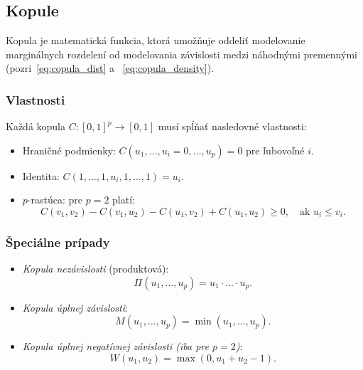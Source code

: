 \subsection{Kopule}
\label{subsec:copulas}

Kopula je matematická funkcia, ktorá umožňuje oddeliť modelovanie marginálnych rozdelení od modelovania závislosti medzi náhodnými premennými (pozri~\ref{eq:copula_dist} a ~\ref{eq:copula_density}).

\subsubsection{Vlastnosti}

Každá kopula $C: [0,1]^p \to [0,1]$ musí spĺňať nasledovné vlastnosti:

\begin{itemize}
  \item Hraničné podmienky: $C(u_1, \dots, u_i = 0, \dots, u_p) = 0$ pre ľubovoľné $i$.
  \item Identita: $C(1, \dots, 1, u_i, 1, \dots, 1) = u_i$.
  \item $p$-rastúca: pre $p=2$ platí:
  \begin{equation}
    C(v_1, v_2) - C(v_1, u_2) - C(u_1, v_2) + C(u_1, u_2) \geq 0, \quad \text{ak } u_i \leq v_i.
  \end{equation}
\end{itemize}

\subsubsection{Špeciálne prípady}

\begin{itemize}
  \item \textit{Kopula nezávislosti} (produktová):
  \begin{equation}
  \Pi(u_1, \dots, u_p) = u_1 \cdot \dots \cdot u_p.
  \end{equation}
  \item \textit{Kopula úplnej závislosti}:
  \begin{equation}
  M(u_1, \dots, u_p) = \min(u_1, \dots, u_p).
  \end{equation}
  \item \textit{Kopula úplnej negatívnej závislosti (iba pre $p=2$)}:
  \begin{equation}
  W(u_1, u_2) = \max(0, u_1 + u_2 - 1).
  \end{equation}
\end{itemize}


